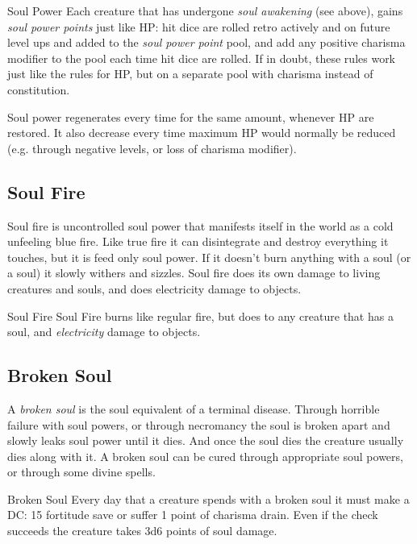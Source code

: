 \begin{35e}{Soul Power}
  Each creature that has undergone \emph{soul awakening} (see above), gains
  \emph{soul power points} just like HP: hit dice are rolled retro actively
  and on future level ups and added to the \emph{soul power point} pool, and
  add any positive charisma modifier to the pool each time hit dice are rolled.
  If in doubt, these rules work just like the rules for HP, but on a separate
  pool with charisma instead of constitution.

  Soul power regenerates every time for the same amount, whenever HP are
  restored. It also decrease every time maximum HP would normally be reduced
  (e.g. through negative levels, or loss of charisma modifier).
\end{35e}

\subsection{Soul Fire}
\label{sec:Soul Fire}

Soul fire is uncontrolled soul power that manifests itself in the world as a
cold unfeeling blue fire. Like true fire it can disintegrate and destroy
everything it touches, but it is feed only soul power. If it doesn't burn
anything with a soul (or a soul) it slowly withers and sizzles. Soul fire does
its own damage to living creatures and souls, and does electricity damage to
objects.

\begin{35e}{Soul Fire}
  Soul Fire burns like regular fire, but does  to any
  creature that has a soul, and \emph{electricity} damage to objects.
\end{35e}

\subsection{Broken Soul}
\label{sec:Broken Soul}

A \emph{broken soul} is the soul equivalent of a terminal disease. Through
horrible failure with soul powers, or through necromancy the soul is broken
apart and slowly leaks soul power until it dies. And once the soul dies the
creature usually dies along with it. A broken soul can be cured through
appropriate soul powers, or through some divine spells.

\begin{35e}{Broken Soul}
  Every day that a creature spends with a broken soul it must make a DC: 15
  fortitude save or suffer 1 point of charisma drain. Even if the check
  succeeds the creature takes 3d6 points of soul damage.
\end{35e}

